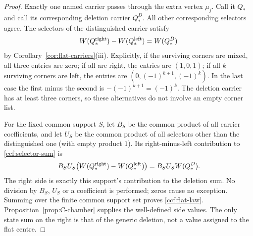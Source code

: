\begin{proof}
Exactly one named carrier passes through the extra vertex $\mu_j$.
Call it $Q_*$ and call its corresponding deletion carrier $Q_*^D$.
All other corresponding selectors agree. The selectors of the
distinguished carrier satisfy
\begin{equation}\label{ccf:distinguished-selector}
W(Q_*^{\rm right})-W(Q_*^{\rm left})=W(Q_*^D)
\end{equation}
by Corollary~\ref{cor:flat-carriers}(iii). Explicitly, if the surviving
corners are mixed, all three entries are zero; if all are right, the
entries are $(1,0,1)$; if all $k$ surviving corners are left, the entries
are $(0,(-1)^{k+1},(-1)^k)$. In the last case the first minus the
second is $-(-1)^{k+1}=(-1)^k$. The deletion carrier has at least
three corners, so these alternatives do not involve an empty corner list.

For the fixed common support $S$, let $B_S$ be the common product of
all carrier coefficients, and let $U_S$ be the common product of all
selectors other than the distinguished one (with empty product $1$).
Its right-minus-left contribution to \eqref{ccf:selector-sum} is
\begin{equation}\label{ccf:term-difference}
B_SU_S\bigl(W(Q_*^{\rm right})-W(Q_*^{\rm left})\bigr)
=B_SU_SW(Q_*^D).
\end{equation}
The right side is exactly this support's contribution to the deletion
sum. No division by $B_S$, $U_S$ or a coefficient is performed; zeros
cause no exception. Summing over the finite common support set proves
\eqref{ccf:flat-law}. Proposition~\ref{prop:C-chamber} supplies the
well-defined side values. The only state sum on the right is that of
the generic deletion, not a value assigned to the flat centre.
\end{proof}

